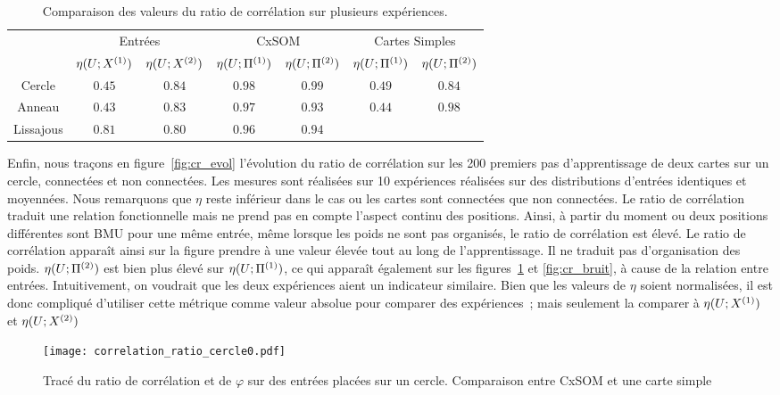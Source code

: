 \documentclass[../main]{subfiles}
\begin{document}
\begin{table}
    \centering
    \caption{Comparaison des valeurs du ratio de corrélation sur plusieurs expériences.}
    \begin{tabular}{*7c}
        \toprule
        & \multicolumn{2}{c}{Entrées} & \multicolumn{2}{c}{CxSOM} & \multicolumn{2}{c}{Cartes Simples} \\
        \cmidrule(lr){2-7}
         & $\eta(U;X^{({1})})$ & $\eta(U;X^{({2})})$  & $\eta(U;\Pi^{({1})})$ & $\eta(U;\Pi^{({2})})$  & $\eta(U;\Pi^{({1})})$ & $\eta(U;\Pi^{({2})})$ \\    
        \midrule
        Cercle &   $0.45 $    & $0.84$  &  $0.98$ & $0.99$ & $0.49$ & $0.84$      \\
        Anneau &  $0.43$      &  $0.83$      & $0.97$ & $0.93$ & $0.44$ & $0.98$ \\
        Lissajous &  $0.81$     &  $0.80$ & $0.96$ & $0.94$  & & \\
        \bottomrule
    \end{tabular}
\end{table}
Enfin, nous traçons en figure~\ref{fig:cr_evol} l'évolution du ratio de corrélation sur les 200 premiers pas d'apprentissage de deux cartes sur un cercle, connectées et non connectées. Les mesures sont réalisées sur 10 expériences réalisées sur des distributions d'entrées identiques et moyennées.
Nous remarquons que $\eta$ reste inférieur dans le cas ou les cartes sont connectées que non connectées. 
Le ratio de corrélation traduit une relation fonctionnelle mais ne prend pas en compte l'aspect continu des positions. Ainsi, à partir du moment ou deux positions différentes sont BMU pour une même entrée, même lorsque les poids ne sont pas organisés, le ratio de corrélation est élevé. Le ratio de corrélation apparaît ainsi sur la figure prendre à une valeur élevée tout au long de l'apprentissage. Il ne traduit pas d'organisation des poids.
$\eta(U;\Pi^{({2})})$ est bien plus élevé sur $\eta(U;\Pi^{({1})})$, ce qui apparaît également sur les figures~\ref{fig:cr_xp} et \ref{fig:cr_bruit}, à cause de la relation entre entrées.
Intuitivement, on voudrait que les deux expériences aient un indicateur similaire.
Bien que les valeurs de $\eta$ soient normalisées, il est donc compliqué d'utiliser cette métrique comme valeur absolue pour comparer des expériences~; mais seulement la comparer à $\eta(U;X^{({1})})$ et $\eta(U;X^{({2})})$

\begin{figure}
    \centering\texttt{[image: correlation\_ratio\_cercle0.pdf]}
    \caption{Tracé du ratio de corrélation et de $\varphi$ sur des entrées placées sur un cercle. Comparaison entre CxSOM et une carte simple \label{fig:cr_xp}}
\end{figure}
\end{document}

